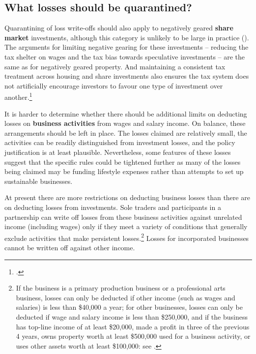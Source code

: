 \subsection{What losses should be quarantined?}
Quarantining of loss write-offs should also apply to negatively geared \textbf{share market} investments, although this category is unlikely to be large in practice (). The arguments for limiting negative gearing for these investments – reducing the tax shelter on wages and the tax bias towards speculative investments – are the same as for negatively geared property. And maintaining a consistent tax treatment across housing and share investments also ensures the tax system does not artificially encourage investors to favour one type of investment over another.\footcite[][133]{Commission2004a}  

It is harder to determine whether there should be additional limits on deducting losses on \textbf{business activities} from wages and salary income.  On balance, these arrangements should be left in place. The losses claimed are relatively small, the activities can be readily distinguished from investment losses, and the policy justification is at least plausible. Nevertheless, some features of these losses suggest that the specific rules could be tightened further as many of the losses being claimed may be funding lifestyle expenses rather than attempts to set up sustainable businesses. 

At present there are more restrictions on deducting business losses than there are on deducting losses from investments. Sole traders and participants in a partnership can write off losses from these business activities against unrelated income (including wages) only if they meet a variety of conditions that generally exclude activities that make persistent losses.\footnote{If the business is a primary production business or a professional arts business, losses can only be deducted if other income (such as wages and salaries) is less than \$40,000 a year; for other businesses, losses can only be deducted if wage and salary income is less than \$250,000, and if the business has top-line income of at least \$20,000, made a profit in three of the previous 4 years, owns property worth at least \$500,000 used for a business activity, or uses other assets worth at least \$100,000: see \textcite{ATO2015OffsettingCurrentYearLosses}.} Losses for incorporated businesses cannot be written off against other income. 

